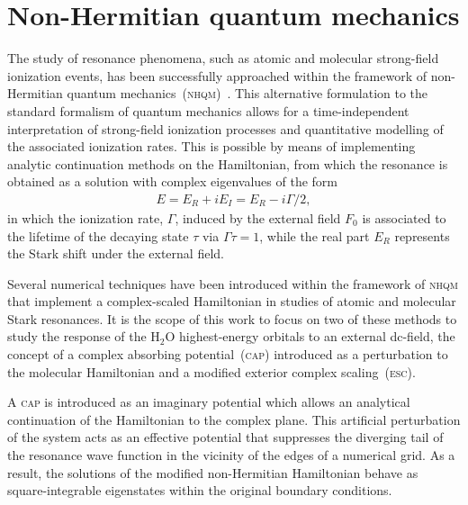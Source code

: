 \section{Non-Hermitian quantum mechanics}
\label{ch:nonH_qm}

The study of resonance phenomena, such as atomic and molecular
strong-field ionization events, has been successfully approached
within the framework of non-Hermitian quantum
mechanics~(\textsc{nhqm})~\cite{Moiseyev_NHQM}. This alternative
formulation to the standard formalism of quantum mechanics allows for
a time-independent interpretation of strong-field ionization processes
and quantitative modelling of the associated ionization rates. This is
possible by means of implementing analytic continuation methods on the
Hamiltonian, from which the resonance is obtained as a solution with
complex eigenvalues of the form
%
\begin{eqnarray}
  E = E_{R} + i E_{I} = E_{R} - i \Gamma/2,
  \label{eq:complex_eigenE}
\end{eqnarray}
%
in which the ionization rate, $\Gamma$, induced by the external field
$F_{0}$ is associated to the lifetime of the decaying state $\tau$ via
$\Gamma\tau = 1$, while the real part $E_{R}$ represents the Stark
shift under the external field.

Several numerical techniques have been introduced within the framework
of \textsc{nhqm} that implement a complex-scaled Hamiltonian in
studies of atomic and molecular Stark resonances. It is the scope of
this work to focus on two of these methods to study the response of
the H$_{2}$O highest-energy orbitals to an external dc-field, the
concept of a complex absorbing potential~(\textsc{cap}) introduced as
a perturbation to the molecular Hamiltonian and a modified exterior
complex scaling~(\textsc{esc}).




A \textsc{cap} is introduced as an imaginary potential which allows an
analytical continuation of the Hamiltonian to the complex plane. This
artificial perturbation of the system acts as an effective potential
that suppresses the diverging tail of the resonance wave function in
the vicinity of the edges of a numerical grid. As a result, the
solutions of the modified non-Hermitian Hamiltonian behave as
square-integrable eigenstates within the original boundary conditions.

